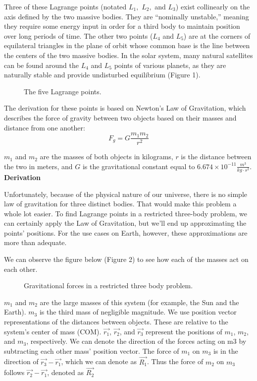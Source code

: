 Three of these Lagrange points (notated $L_1,$ $L_2,$ and $L_3$) exist collinearly on the axis defined by the two massive bodies. They are “nominally unstable,” meaning they require some energy input in order for a third body to maintain position over long periods of time. The other two points ($L_4$ and $L_5$) are at the corners of equilateral triangles in the plane of orbit whose common base is the line between the centers of the two massive bodies. In the solar system, many natural satellites can be found around the $L_4$ and $L_5$ points of various planets, as they are naturally stable and provide undisturbed equilibrium (Figure 1). 

\begin{figure}[h]
  \caption{The five Lagrange points.}
  \label{fig:1}
\end{figure}

The derivation for these points is based on Newton’s Law of Gravitation, which describes the force of gravity between two objects based on their masses and distance from one another: \[F_g = G\frac{m_1m_2}{r^2}\]

$m_1$ and $m_2$ are the masses of both objects in kilograms, $r$ is the distance between the two in meters, and $G$ is the gravitational constant equal to $6.674\times{10^{-11}} \frac{m^3}{kg\cdot{}s^2}$.
\newline\newline
\textbf{Derivation}
\newline

Unfortunately, because of the physical nature of our universe, there is no simple law of gravitation for three distinct bodies. That would make this problem a whole lot easier. To find Lagrange points in a restricted three-body problem, we can certainly apply the Law of Gravitation, but we’ll end up approximating the points’ positions. For the use cases on Earth, however, these approximations are more than adequate. 

We can observe the figure below (Figure 2) to see how each of the masses act on each other. 

\begin{figure}[h]
  \caption{Gravitational forces in a restricted three body problem.}
  \label{fig:2}
\end{figure}

$m_1$ and $m_2$ are the large masses of this system (for example, the Sun and the Earth). $m_3$ is the third mass of negligible magnitude. We use position vector representations of the distances between objects. These are relative to the system’s center of mass (COM). $\vec{r_1}$, $\vec{r_2}$, and $\vec{r_3}$ represent the positions of $m_1$, $m_2$, and $m_3$, respectively. We can denote the direction of the forces acting on m3 by subtracting each other mass’ position vector. The force of $m_1$ on $m_3$ is in the direction of $\vec{r_3}-\vec{r_1}$, which we can denote as $\vec{R_1}$. Thus the force of $m_2$ on $m_3$ follows $\vec{r_2}-\vec{r_1}$, denoted as $\vec{R_2}$

